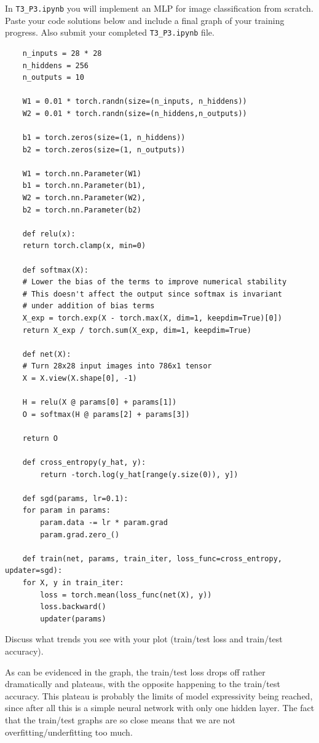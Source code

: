 \documentclass[expanded]{lkx_pset}
\begin{document}
\begin{parts}
	\begin{part}{1}
		In \verb|T3_P3.ipynb| you will implement an MLP for image classification from scratch. Paste your code solutions below and include a final graph of your training progress. Also submit your completed \verb|T3_P3.ipynb| file.
	\end{part}

	\begin{verbatim}
	n_inputs = 28 * 28
	n_hiddens = 256
	n_outputs = 10

	W1 = 0.01 * torch.randn(size=(n_inputs, n_hiddens))
	W2 = 0.01 * torch.randn(size=(n_hiddens,n_outputs))

	b1 = torch.zeros(size=(1, n_hiddens))
	b2 = torch.zeros(size=(1, n_outputs))

	W1 = torch.nn.Parameter(W1)
	b1 = torch.nn.Parameter(b1),
	W2 = torch.nn.Parameter(W2),
	b2 = torch.nn.Parameter(b2)

	def relu(x):
  	return torch.clamp(x, min=0)

	def softmax(X):
  	# Lower the bias of the terms to improve numerical stability
  	# This doesn't affect the output since softmax is invariant 
  	# under addition of bias terms
  	X_exp = torch.exp(X - torch.max(X, dim=1, keepdim=True)[0])
  	return X_exp / torch.sum(X_exp, dim=1, keepdim=True)

	def net(X):
  	# Turn 28x28 input images into 786x1 tensor
  	X = X.view(X.shape[0], -1)

  	H = relu(X @ params[0] + params[1])
  	O = softmax(H @ params[2] + params[3])

  	return O

	def cross_entropy(y_hat, y):
    	return -torch.log(y_hat[range(y.size(0)), y])

	def sgd(params, lr=0.1):
  	for param in params:
      	param.data -= lr * param.grad
      	param.grad.zero_()

	def train(net, params, train_iter, loss_func=cross_entropy, updater=sgd):
  	for X, y in train_iter:
      	loss = torch.mean(loss_func(net(X), y))
      	loss.backward()
      	updater(params)
  \end{verbatim}

	\begin{part}{2}
		Discuss what trends you see with your plot (train/test loss and train/test accuracy).
	\end{part}

	As can be evidenced in the graph, the train/test loss drops off rather dramatically and plateaus, with the opposite happening to the train/test accuracy. This plateau is probably the limits of model expressivity being reached, since after all this is a simple neural network with only one hidden layer. The fact that the train/test graphs are so close means that we are not overfitting/underfitting too much.


\end{parts}
\end{document}
